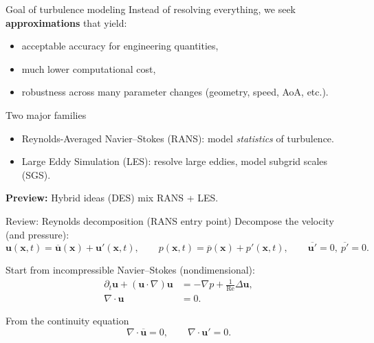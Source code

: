 \documentclass[aspectratio=169]{beamer}
\newcommand{\x}{\bm{x}}
\newcommand{\uu}{\bm{u}}
\newcommand{\pp}{p}
\newcommand{\Rey}{\mathrm{Re}}
\newcommand{\avg}[1]{\overline{#1}}
\newcommand{\up}{\uu'}
\newcommand{\ubar}{\avg{\uu}}
\newcommand{\grad}{\nabla}
\newcommand{\Div}{\nabla\cdot}
\newcommand{\Lap}{\Delta}
\begin{document}
\begin{frame}{Goal of turbulence modeling}
Instead of resolving everything, we seek \textbf{approximations} that yield:
\begin{itemize}
  \item acceptable accuracy for engineering quantities,
  \item much lower computational cost,
  \item robustness across many parameter changes (geometry, speed, AoA, etc.).
\end{itemize}

\begin{block}{Two major families}
\begin{itemize}
  \item Reynolds-Averaged Navier--Stokes (RANS): model \emph{statistics} of turbulence.
  \item Large Eddy Simulation (LES): resolve large eddies, model subgrid scales (SGS).
\end{itemize}
\end{block}

\textbf{Preview:} Hybrid ideas (DES) mix RANS + LES.
\end{frame}

\begin{frame}{Review: Reynolds decomposition (RANS entry point)}
Decompose the velocity (and pressure):
\[
\uu(\x,t)=\ubar(\x)+\up(\x,t),
\qquad
\pp(\x,t)=\avg{\pp}(\x)+\pp'(\x,t),
\qquad
\avg{\up}=0,\ \avg{\pp'}=0.
\]

Start from incompressible Navier--Stokes (nondimensional):
\begin{align*}
\partial_t \uu + (\uu\cdot\grad)\uu &= -\grad \pp + \frac{1}{\Rey}\Lap\uu,\\
\Div\uu &= 0.
\end{align*}

\begin{block}{From the continuity equation}
\[
\Div\ubar=0,\qquad \Div\up=0.
\]
\end{block}
\end{frame}
\end{document}

